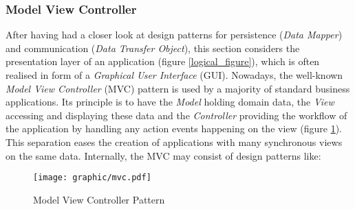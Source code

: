%
%
%
%
%
%
%

\subsubsection{Model View Controller}
\label{model_view_controller_heading}

After having had a closer look at design patterns for persistence
(\emph{Data Mapper}) and communication (\emph{Data Transfer Object}), this
section considers the presentation layer of an application (figure
\ref{logical_figure}), which is often realised in form of a
\emph{Graphical User Interface} (GUI). Nowadays, the well-known
\emph{Model View Controller} (MVC) pattern \cite{buschmann, fowler2002} is used
by a majority of standard business applications. Its principle is to have the
\emph{Model} holding domain data, the \emph{View} accessing and displaying
these data and the \emph{Controller} providing the workflow of the application
by handling any action events happening on the view (figure \ref{mvc_figure}).
This separation eases the creation of applications with many synchronous views
on the same data. Internally, the MVC may consist of design patterns like:

\begin{figure}[ht]
    \begin{center}
        \texttt{[image: graphic/mvc.pdf]}
        \caption{Model View Controller Pattern}
        \label{mvc_figure}
    \end{center}
\end{figure}

